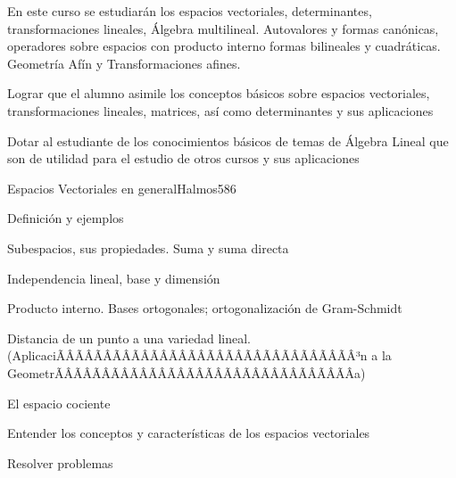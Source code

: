 \begin{sumilla}


\begin{fundamentacion}
En este curso se estudiar\'an los espacios vectoriales, determinantes, transformaciones lineales, \'Algebra multilineal.
Autovalores y formas can\'onicas, operadores sobre espacios con producto interno formas bilineales y cuadr\'aticas. Geometr\'ia Af\'in y Transformaciones afines.
\end{fundamentacion}

\begin{objetivosdelcurso}
\item  Lograr que el alumno asimile los conceptos b\'asicos sobre espacios vectoriales, transformaciones lineales, matrices, as\'i como determinantes y sus aplicaciones
\item  Dotar al estudiante de los conocimientos b\'asicos de temas de \'Algebra Lineal que son de utilidad para el estudio de otros cursos y sus aplicaciones
\end{objetivosdelcurso}

\begin{outcomes}
\end{outcomes}

\begin{unit}{Espacios Vectoriales en general}{Halmos58}{6}
   \begin{topicos}
         \item  Definici\'on y ejemplos
	 \item  Subespacios, sus propiedades. Suma y suma directa
         \item  Independencia lineal, base y dimensi\'on
	 \item  Producto interno. Bases ortogonales; ortogonalizaci\'on de Gram-Schmidt
         \item  Distancia de un punto a una variedad lineal. (AplicaciÃÂÃÂÃÂÃÂÃÂÃÂÃÂÃÂÃÂÃÂÃÂÃÂÃÂÃÂÃÂÃÂ³n a la GeometrÃÂÃÂÃÂÃÂÃÂÃÂÃÂÃÂÃÂÃÂÃÂÃÂÃÂÃÂÃÂÃÂ­a)
         \item  El espacio cociente
   \end{topicos}

   \begin{objetivos}
         \item  Entender los conceptos y caracter\'isticas de los espacios vectoriales
         \item  Resolver problemas
   \end{objetivos}
\end{unit}


\end{sumilla}
